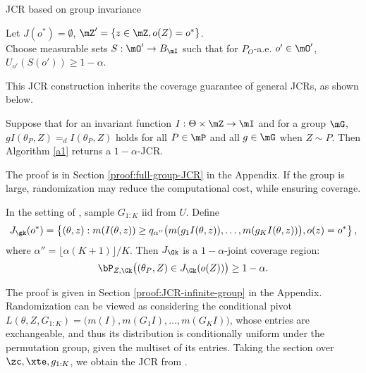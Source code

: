 \documentclass[english]{article}
\begin{document}
\begin{algorithm}
\caption{JCR based on group invariance}
{}
Let $J(o^*) = \emptyset$, $\mZ' = \{z \in \mZ, o(Z)=o^*\}$.\\
Choose measurable sets $S: \mO' \to B_{\mI}$ such that for $P_O$-a.e.  $o' \in \mO'$,  $U_{o'}(S(o'))\ge 1-\alpha$.\\
\label{a1}
\end{algorithm}
This JCR construction inherits the coverage guarantee of general JCRs, as shown below.
\begin{theorem}\label{full-group-JCR}
Suppose that for an invariant function $I:\Theta \times \mZ \to \mI$ and for a group $\mG$, $gI(\theta_P,Z) =_d I(\theta_P,Z)$ holds for all $P \in \mP$ and all $g\in \mG$ when $Z\sim P$. 
Then
Algorithm \ref{a1} returns a $1-\alpha$-JCR.
\end{theorem}

The proof is in Section \ref{proof:full-group-JCR} in the Appendix. 
If the group is large, randomization may reduce the computational cost, while ensuring coverage.
\begin{theorem}\label{sample-JCR}
In the setting of , sample $G_{1:K}$ iid from $U$. Define 
$$J_{\gk}(o^*) = \left\{(\theta,z): m(I(\theta,z)) \ge q_{\alpha''}\big( m(g_1I(\theta,z)),\ldots, m(g_KI(\theta,z))\big), o(z) = o^*\right\},$$ where $\alpha'' = \lfloor \alpha(K+1)\rfloor/K$.
Then $J_{\Gk}$ is a $1-\alpha$-joint coverage region:
    \begin{align*}
        \bP_{Z,\Gk}\big( (\theta_P,Z) \in J_{\Gk}(o(Z))\big) \ge 1 - \alpha.
    \end{align*}
\end{theorem}
The proof is given in Section \ref{proof:JCR-infinite-group} in the Appendix. 
Randomization 
can be viewed as considering 
the conditional pivot $L(\theta,Z,G_{1:K}) = \big(m(I),m(G_1I),\ldots,m(G_KI)\big)$,
whose entries are exchangeable, 
and thus its distribution is conditionally uniform under the permutation group, given the multiset of its entries. 
Taking the section over $\zc,\xte,g_{1:K}$,
we obtain the JCR from .
\end{document}

